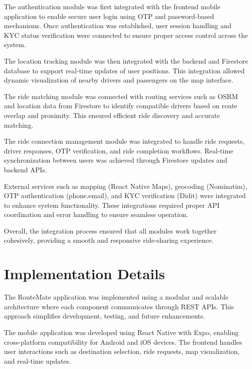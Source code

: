 \documentclass[10pt,a4paper]{report}
\begin{document}
\justify\large The authentication module was first integrated with the frontend mobile application to enable secure user login using OTP and password-based mechanisms. Once authentication was established, user session handling and KYC status verification were connected to ensure proper access control across the system.

\justify\large The location tracking module was then integrated with the backend and Firestore database to support real-time updates of user positions. This integration allowed dynamic visualization of nearby drivers and passengers on the map interface.

\justify\large The ride matching module was connected with routing services such as OSRM and location data from Firestore to identify compatible drivers based on route overlap and proximity. This ensured efficient ride discovery and accurate matching.

\justify\large The ride connection management module was integrated to handle ride requests, driver responses, OTP verification, and ride completion workflows. Real-time synchronization between users was achieved through Firestore updates and backend APIs.

\justify\large External services such as mapping (React Native Maps), geocoding (Nominatim), OTP authentication (phone.email), and KYC verification (Didit) were integrated to enhance system functionality. These integrations required proper API coordination and error handling to ensure seamless operation.

\justify\large Overall, the integration process ensured that all modules work together cohesively, providing a smooth and responsive ride-sharing experience.

\section{Implementation Details}

\justify\large The RouteMate application was implemented using a modular and scalable architecture where each component communicates through REST APIs. This approach simplifies development, testing, and future enhancements.

\justify\large The mobile application was developed using React Native with Expo, enabling cross-platform compatibility for Android and iOS devices. The frontend handles user interactions such as destination selection, ride requests, map visualization, and real-time updates.
\end{document}
